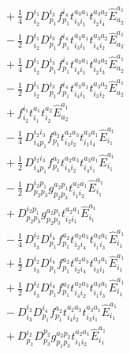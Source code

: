 \documentclass[11pt]{article}
\begin{document}
\begin{align}
&\quad + \tfrac{1}{4}\, D^{i_{1}}_{i_{2}} D^{i_{3}}_{p_{1}} f^{i_{4}}_{p_{1}} t^{a_{3}a_{1}}_{i_{3}i_{1}} t^{a_{3}a_{2}}_{i_{2}i_{4}} \hat{E}^{a_{1}}_{a_{2}} \\
&\quad - \tfrac{1}{2}\, D^{i_{1}}_{i_{2}} D^{i_{3}}_{p_{1}} f^{i_{4}}_{p_{1}} t^{a_{3}a_{1}}_{i_{3}i_{1}} t^{a_{3}a_{2}}_{i_{4}i_{2}} \hat{E}^{a_{1}}_{a_{2}} \\
&\quad + \tfrac{1}{4}\, D^{i_{1}}_{i_{2}} D^{i_{3}}_{p_{1}} f^{i_{4}}_{p_{1}} t^{a_{3}a_{1}}_{i_{4}i_{1}} t^{a_{3}a_{2}}_{i_{2}i_{3}} \hat{E}^{a_{1}}_{a_{2}} \\
&\quad - \tfrac{1}{2}\, D^{i_{1}}_{i_{2}} D^{i_{3}}_{p_{1}} f^{i_{4}}_{p_{1}} t^{a_{3}a_{1}}_{i_{4}i_{1}} t^{a_{3}a_{2}}_{i_{3}i_{2}} \hat{E}^{a_{1}}_{a_{2}} \\
&\quad + f^{i_{1}}_{i_{2}} t^{a_{1}}_{i_{1}} t^{a_{2}}_{i_{2}} \hat{E}^{a_{1}}_{a_{2}} \\
&\quad - \tfrac{1}{4}\, D^{i_{2}i_{3}}_{i_{4}p_{1}} f^{a_{2}}_{p_{1}} t^{a_{2}a_{3}}_{i_{3}i_{2}} t^{a_{3}a_{1}}_{i_{1}i_{4}} \hat{E}^{a_{1}}_{i_{1}} \\
&\quad + \tfrac{1}{2}\, D^{i_{2}i_{3}}_{i_{4}p_{1}} f^{a_{2}}_{p_{1}} t^{a_{2}a_{3}}_{i_{3}i_{2}} t^{a_{3}a_{1}}_{i_{4}i_{1}} \hat{E}^{a_{1}}_{i_{1}} \\
&\quad - \tfrac{1}{2}\, D^{i_{2}p_{1}}_{p_{2}p_{3}} g^{a_{2}p_{1}}_{p_{2}p_{3}} t^{a_{2}a_{1}}_{i_{1}i_{2}} \hat{E}^{a_{1}}_{i_{1}} \\
&\quad + D^{i_{2}p_{1}}_{p_{2}p_{3}} g^{a_{2}p_{1}}_{p_{2}p_{3}} t^{a_{2}a_{1}}_{i_{2}i_{1}} \hat{E}^{a_{1}}_{i_{1}} \\
&\quad - \tfrac{1}{4}\, D^{i_{2}}_{i_{3}} D^{i_{4}}_{p_{1}} f^{a_{2}}_{p_{1}} t^{a_{2}a_{3}}_{i_{2}i_{4}} t^{a_{3}a_{1}}_{i_{1}i_{3}} \hat{E}^{a_{1}}_{i_{1}} \\
&\quad + \tfrac{1}{2}\, D^{i_{2}}_{i_{3}} D^{i_{4}}_{p_{1}} f^{a_{2}}_{p_{1}} t^{a_{2}a_{3}}_{i_{2}i_{4}} t^{a_{3}a_{1}}_{i_{3}i_{1}} \hat{E}^{a_{1}}_{i_{1}} \\
&\quad + \tfrac{1}{2}\, D^{i_{2}}_{i_{3}} D^{i_{4}}_{p_{1}} f^{a_{2}}_{p_{1}} t^{a_{2}a_{3}}_{i_{4}i_{2}} t^{a_{3}a_{1}}_{i_{1}i_{3}} \hat{E}^{a_{1}}_{i_{1}} \\
&\quad - D^{i_{2}}_{i_{3}} D^{i_{4}}_{p_{1}} f^{a_{2}}_{p_{1}} t^{a_{2}a_{3}}_{i_{4}i_{2}} t^{a_{3}a_{1}}_{i_{3}i_{1}} \hat{E}^{a_{1}}_{i_{1}} \\
&\quad + D^{i_{2}}_{p_{1}} D^{p_{2}}_{p_{3}} g^{a_{2}p_{2}}_{p_{1}p_{3}} t^{a_{2}a_{1}}_{i_{1}i_{2}} \hat{E}^{a_{1}}_{i_{1}} \\

\end{align}
\end{document}
